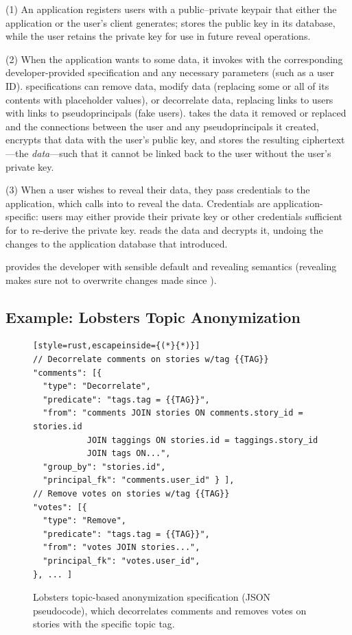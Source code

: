 %
(1) An application registers users with a public--private keypair
that either the application or the user's client generates; \sys stores the
public key in its database, while the user retains the private key for use in
future reveal operations.
%

%
(2) When the application wants to \xx some data, it invokes \sys with the
corresponding developer-provided \xx specification and any necessary
parameters (such as a user ID).
%
\Xx specifications can remove data, modify data (replacing some or all of its
contents with placeholder values), or decorrelate data, replacing
links to users with links to pseudoprincipals (fake users).
%
%
\sys takes the data it removed or replaced and the connections between
the user and any pseudoprincipals it created, encrypts that data with the user's
public key, and stores the resulting ciphertext---the \emph{\xxed
data}---such that it cannot be linked back to the user without the user's
private key.
%
%

%
(3) When a user wishes to reveal their \xxed data, they pass credentials
to the application, which calls into \sys to reveal the data.
%
Credentials are application-specific: users may either provide their private
key or other credentials sufficient for \sys to re-derive the private key.
%
\sys reads the \xxed data and decrypts it, undoing the changes to the
application database that \xxing introduced.

%
\sys provides the developer with sensible default \xxing and revealing
semantics (\eg revealing makes sure not to overwrite changes made since
\xxing).

\subsection{Example: Lobsters Topic Anonymization}
\label{s:design:lobsters}

\begin{figure}[t]
\centering
\begin{lstlisting}[style=rust,escapeinside={(*}{*)}]
// Decorrelate comments on stories w/tag {{TAG}}
"comments": [{
  "type": "Decorrelate",
  "predicate": "tags.tag = {{TAG}}",
  "from": "comments JOIN stories ON comments.story_id = stories.id
           JOIN taggings ON stories.id = taggings.story_id
           JOIN tags ON...",
  "group_by": "stories.id",
  "principal_fk": "comments.user_id" } ],
// Remove votes on stories w/tag {{TAG}}
"votes": [{
  "type": "Remove",
  "predicate": "tags.tag = {{TAG}}",
  "from": "votes JOIN stories...",
  "principal_fk": "votes.user_id",
}, ... ]
\end{lstlisting}
    \caption{Lobsters topic-based anonymization \xx specification (JSON
    pseudocode), which decorrelates comments and removes votes on stories with
    the specific topic tag.}
\label{f:spec}
\end{figure}



